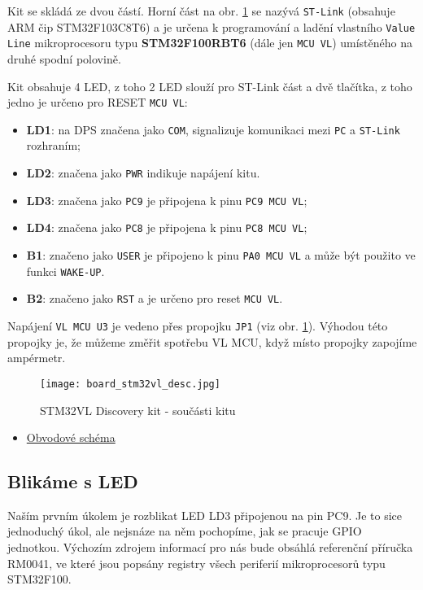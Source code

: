     Kit se skládá ze dvou částí. Horní část na obr. \ref{MIT:fig_stm32_desc} se nazývá 
    \texttt{ST-Link} (obsahuje ARM čip STM32F103C8T6) a je určena k programování a ladění vlastního 
    \texttt{Value Line} mikroprocesoru typu \textbf{STM32F100RBT6} (dále jen \texttt{MCU VL}) 
    umístěného na druhé spodní polovině.
  
    Kit obsahuje 4 LED, z toho 2 LED slouží pro ST-Link část a dvě tlačítka, z toho jedno je určeno 
    pro RESET \texttt{MCU VL}:
    \begin{itemize}\addtolength{\itemsep}{-0.5\baselineskip}
      \item {\color{red} \textbf{LD1}}: na DPS značena jako \texttt{COM}, signalizuje komunikaci 
            mezi \texttt{PC} a \texttt{ST-Link} rozhraním;
      \item {\color{red} \textbf{LD2}}: značena jako \texttt{PWR} indikuje napájení kitu.
      \item {\color{blue} \textbf{LD3}}: značena jako \texttt{PC9} je připojena k pinu \texttt{PC9 
             MCU VL};
      \item {\color{green} \textbf{LD4}}: značena jako \texttt{PC8} je připojena k pinu   
            \texttt{PC8 MCU VL};
      \item \textbf{B1}: značeno jako \texttt{USER} je připojeno k pinu \texttt{PA0 MCU VL} a může 
            být použito ve funkci \texttt{WAKE-UP}.
      \item \textbf{B2}: značeno jako \texttt{RST} a je určeno pro reset \texttt{MCU VL}.
    \end{itemize}
    
    Napájení \texttt{VL MCU U3} je vedeno přes propojku \texttt{JP1} (viz obr. 
    \ref{MIT:fig_stm32_desc}). Výhodou této propojky je, že můžeme změřit spotřebu VL MCU, když 
    místo 
    propojky zapojíme ampérmetr.
    \begin{figure}[ht!] %
      \centering
      \texttt{[image: board\_stm32vl\_desc.jpg]}
      \caption{STM32VL Discovery kit - součásti kitu}
      \label{MIT:fig_stm32_desc}
    \end{figure}
    
    \begin{itemize}\addtolength{\itemsep}{-0.5\baselineskip}
      \item \href{http://librarian/stable.php?id=142}{Obvodové schéma}
    \end{itemize}
    
    \subsection{Blikáme s LED}
      Naším prvním úkolem je rozblikat LED LD3 připojenou na pin PC9. Je to sice jednoduchý úkol, 
      ale 
      nejsnáze na něm pochopíme, jak se pracuje GPIO jednotkou. Výchozím zdrojem informací pro nás 
      bude obsáhlá referenční příručka RM0041, ve které jsou popsány registry všech periferií 
      mikroprocesorů typu STM32F100.

\printbibliography[title={Seznam literatury}, heading=subbibliography]
